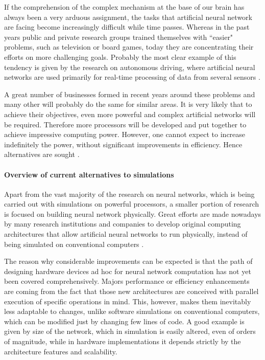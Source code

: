 If the comprehension of the complex mechanism at the base of our brain has always been a very arduous assignment, the tasks that artificial neural network are facing become increasingly difficult while time passes.
Whereas in the past years public and private research groups trained themselves with ``easier" problems, such as television or board games, today they are concentrating their efforts on more challenging goals.
Probably the most clear example of this tendency is given by the research on autonomous driving, where artificial neural networks are used primarily for real-time processing of data from several sensors \cite{roadDetection}.

A great number of businesses formed in recent years around these problems and many other will probably do the same for similar areas.
It is very likely that to achieve their objectives, even more powerful and complex artificial networks will be required.
Therefore more processors will be developed and put together to achieve impressive computing power.
However, one cannot expect to increase indefinitely the power, without significant improvements in efficiency.
Hence alternatives are sought \cite{soman2016recent}.

\paragraph{Overview of current alternatives to simulations\\}
Apart from the vast majority of the research on neural networks, which is being carried out with simulations on powerful processors, a smaller portion of research is focused on building neural network physically.
Great efforts are made nowadays by many research institutions and companies to develop original computing architectures that allow artificial neural networks to run physically, instead of being simulated on conventional computers \cite{soman2016recent}.

The reason why considerable improvements can be expected is that the path of designing hardware devices ad hoc for neural network computation has not yet been covered comprehensively.
Majors performance or efficiency enhancements are coming from the fact that those new architectures are conceived with parallel execution of specific operations in mind.
This, however, makes them inevitably less adaptable to changes, unlike software simulations on conventional computers, which can be modified just by changing few lines of code.
A good example is given by size of the network, which in simulation is easily altered, even of orders of magnitude, while in hardware implementations it depends strictly by the architecture features and scalability.

